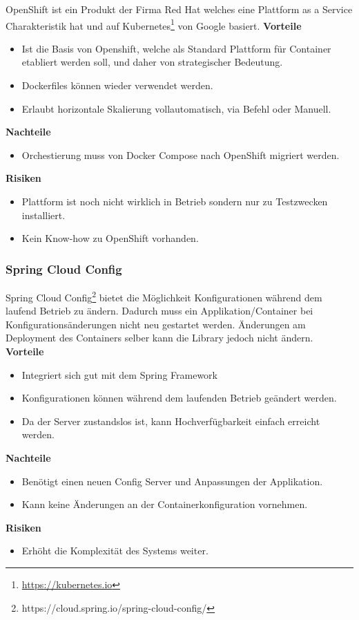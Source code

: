 OpenShift ist ein Produkt der Firma Red Hat welches eine Plattform as a Service Charakteristik hat und auf Kubernetes\footnote{\url{https://kubernetes.io}} von Google basiert.
\textbf{Vorteile}
\begin{itemize}
	\item Ist die Basis von Openshift, welche als Standard Plattform für Container etabliert werden soll, und daher von strategischer Bedeutung.
	\item Dockerfiles können wieder verwendet werden.
	\item Erlaubt horizontale Skalierung vollautomatisch, via Befehl oder Manuell.
\end{itemize}
\textbf{Nachteile}
\begin{itemize}
	\item Orchestierung muss von Docker Compose nach OpenShift migriert werden.
\end{itemize}
\textbf{Risiken}
\begin{itemize}
	\item Plattform ist noch nicht wirklich in Betrieb sondern nur zu Testzwecken installiert.
	\item Kein Know-how zu OpenShift vorhanden.
\end{itemize}

\subsubsection{Spring Cloud Config}
Spring Cloud Config\footnote{https://cloud.spring.io/spring-cloud-config/} bietet die Möglichkeit Konfigurationen während dem laufend Betrieb zu ändern. Dadurch muss ein Applikation/Container bei Konfigurationsänderungen nicht neu gestartet werden. Änderungen am Deployment des Containers selber kann die Library jedoch nicht ändern.\newline
\newpage
\textbf{Vorteile}
\begin{itemize}
	\item Integriert sich gut mit dem Spring Framework
	\item Konfigurationen können während dem laufenden Betrieb geändert werden.
	\item Da der Server zustandslos ist, kann Hochverfügbarkeit einfach erreicht werden.
\end{itemize}
\textbf{Nachteile}
\begin{itemize}
	\item Benötigt einen neuen Config Server und Anpassungen der Applikation.
	\item Kann keine Änderungen an der Containerkonfiguration vornehmen.
\end{itemize}
\textbf{Risiken}
\begin{itemize}
	\item Erhöht die Komplexität des Systems weiter.
\end{itemize}

